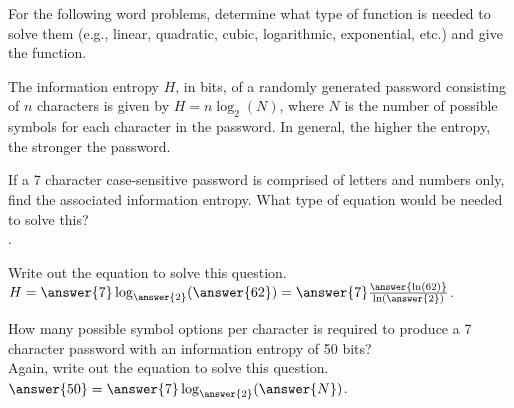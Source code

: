 \documentclass{ximera}
\author{Elizabeth Campolongo}
\begin{document}
\begin{exercise}
For the following word problems, determine what type of function is needed to solve them (e.g., linear, quadratic, cubic, logarithmic, exponential, etc.) and give the function. 
%


\item The information entropy $H$, in bits, of a randomly generated password consisting
of $n$ characters is given by $H = n\log_2(N)$, where $N$ is the number of possible symbols for each
character in the password. In general, the higher the entropy, the stronger the password.

If a 7 character case-sensitive password is comprised of letters and numbers only, find the
associated information entropy.
What type of equation would be needed to solve this?\\
.
\begin{exercise}
Write out the equation to solve this question.\\
$H = \answer{7}\log_{\answer{2}}(\answer{62}) = \answer{7}\frac{\answer{\ln(62)}}{\ln(\answer{2})}$.

\begin{exercise}
How many possible symbol options per character is required to produce a 7 character password
with an information entropy of 50 bits?\\
Again, write out the equation to solve this question.\\
$\answer{50} = \answer{7}\log_{\answer{2}}(\answer{N})$.
\end{exercise}
\end{exercise}


\end{exercise}
\end{document}
